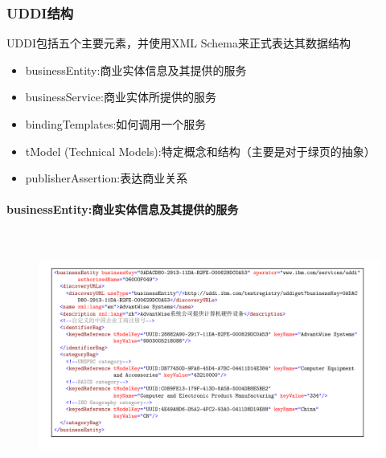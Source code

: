 \subsubsection{UDDI结构}
UDDI包括五个主要元素，并使用XML Schema来正式表达其数据结构
\vspace{-0.8em}
\begin{multicols}{2}
    \begin{itemize}
        \item businessEntity:商业实体信息及其提供的服务
        \item businessService:商业实体所提供的服务
        \item bindingTemplates:如何调用一个服务
        \item tModel (Technical Models):特定概念和结构（主要是对于绿页的抽象）
        \item publisherAssertion:表达商业关系
    \end{itemize}
\end{multicols}
\vspace{-1em}

\paragraph*{businessEntity:商业实体信息及其提供的服务}~{} \par
\begin{figure}[H]
    \vspace{-0.5em}
	\centering
	\includegraphics[width=\textwidth]{images/businessEntitiy.pdf}
    \vspace{-3em}
\end{figure}

